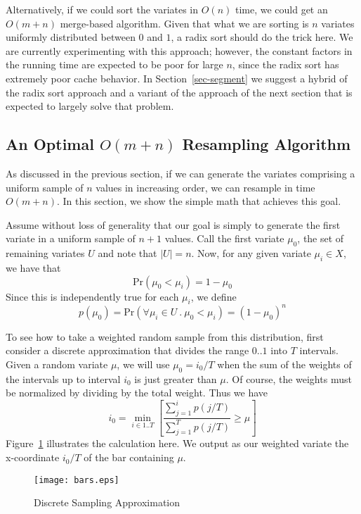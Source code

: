 \documentclass[12pt]{article}
\newcommand{\Prob}{\text{Pr}}
\begin{document}
  Alternatively, if we could sort the variates in $O(n)$
  time, we could get an $O(m + n)$ merge-based algorithm.
  Given that what we are sorting is $n$ variates uniformly
  distributed between $0$ and $1$, a radix sort should do
  the trick here.  We are currently experimenting with this
  approach; however, the constant factors in the running
  time are expected to be poor for large $n$, since the
  radix sort has extremely poor cache behavior.  In
  Section~\ref{sec-segment} we suggest a hybrid of the radix
  sort approach and a variant of the approach of the
  next section that is expected to largely
  solve that problem.

\subsection{An Optimal $O(m + n)$ Resampling Algorithm}\label{sec-optimal}

  As discussed in the previous section, if we can generate
  the variates comprising a uniform sample of $n$ values in
  increasing order, we can resample in time $O(m + n)$.  In
  this section, we show the simple math that achieves this
  goal.

  Assume without loss of generality that our goal is simply
  to generate the first variate in a uniform sample of $n +
  1$ values.  Call the first variate $\mu_0$, the set of
  remaining variates $U$ and note that $|U|=n$.  Now, for
  any given variate $\mu_i \in X$, we have that
    $$ \Prob(\mu_0 < \mu_i) = 1 - \mu_0 $$
  Since this is independently true for each $\mu_i$, we define
    $$p(\mu_0) = \Prob(\forall \mu_i \in U ~.~ \mu_0 < \mu_i) = (1 - \mu_0)^n$$
  
  To see how to take a weighted random sample from this
  distribution, first consider a discrete approximation that
  divides the range $0..1$ into $T$ intervals.  Given a
  random variate $\mu$, we will use $\mu_0=i_0/T$ when
  the sum of the weights of the intervals up to interval $i_0$
  is just greater than $\mu$.  Of course, the weights must be
  normalized by dividing by the total weight.  Thus we have
    $$i_0=\min_{i\in1..T}\left[{\frac{\sum_{j=1}^{i}{p(j/T)}}
                         {\sum_{j=1}^{T}{p(j/T)}} \ge \mu}\right]$$
  Figure~\ref{fig-calculus} illustrates the calculation
  here.  We output as our weighted variate the
  x-coordinate $i_0/T$ of the bar containing $\mu$.

  \begin{figure}
    \centering
    \texttt{[image: bars.eps]}
    \caption{Discrete Sampling Approximation}\label{fig-calculus}
  \end{figure}
\end{document}
